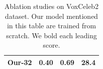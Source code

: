\documentclass[runningheads]{llncs}
\begin{document}
\begin{table}[ht]
\begin{minipage}[b]{0.45\linewidth}
\begin{tabular}{  p{3.2cm} | p{0.9cm} p{0.9cm} p{0.9cm}}
{Our-32} & \bf{0.40}  & {0.69} &  \textbf{28.4}   \\
    \bottomrule
  \end{tabular}
  \caption{Ablation studies on VoxCeleb2 dataset. Our model mentioned in this table are trained from scratch. We bold each leading score.}
    \label{tab:alation}
\end{minipage}
\end{table}


\end{document}
